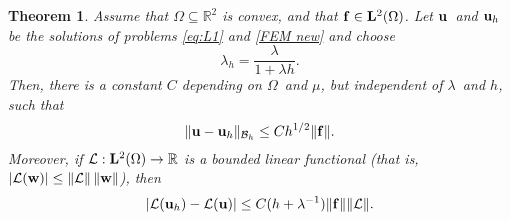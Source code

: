 \documentclass[11pt]{article}
\newcommand{\calB}{\mathcal{B}}
\newcommand{\calL}{\mathcal{L}}
\newcommand{\vf}{{\bf f}}
\newcommand{\vu}{{\bf u}}
\newcommand{\vw}{{\bf w}}
\newcommand{\R}{\mathbb{R}}
\numberwithin{equation}{section}
\newtheorem{theorem}{Theorem}[section]
\begin{document}
\begin{theorem}\label{Convergence theorem}
Assume that $\Omega\subseteq\mathbb{R}^2$ is convex, and that
$\vf \in {\bf L}^2(\Omega)$. Let $\vu$~and 
$\vu_h$ be the solutions of problems \eqref{eq:L1} and \eqref{FEM new}
and choose
\begin{equation}\label{eq: lambda_h}
\lambda_h=\frac{\lambda}{1+\lambda h}.
\end{equation}
Then, there is a constant $C$ depending on $\Omega$~and $\mu$, but independent
of $\lambda$~and $h$, such that
\[
\|\vu-\vu_h\|_{\calB_h}\le Ch^{1/2}\|\vf\|.
\]
Moreover, if $\calL:{\bf L}^2(\Omega) \to \R$ is a bounded  linear functional
(that is, $|\calL(\vw)|\le \|\calL\|\,\|\vw\|$), then
\begin{equation}\label{convergence calL}
|\calL(\vu_h)-\calL(\vu)|\le C(h+\lambda^{-1})\|\vf\|\|\calL\|.
\end{equation}
\end{theorem}
\end{document}
